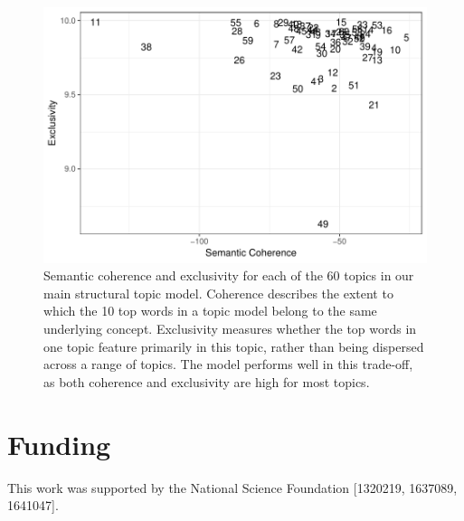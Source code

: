 \documentclass[11pt]{article}
\begin{document}



\begin{figure}
	\centering
	\includegraphics{figures/stm_60_coherence_exclusivity.pdf}
	\caption{Semantic coherence and exclusivity for each of the 60 topics in our main structural topic model. Coherence describes the extent to which the 10 top words in a topic model belong to the same underlying concept. Exclusivity measures whether the top words in one topic feature primarily in this topic, rather than being dispersed across a range of topics. The model performs well in this trade-off, as both coherence and exclusivity are high for most topics.}
	\label{fig:coherence_exclusivity}
\end{figure}



\section*{Funding}
This work was supported by the National Science Foundation [1320219, 1637089, 1641047].

%
%

%




\end{document}
